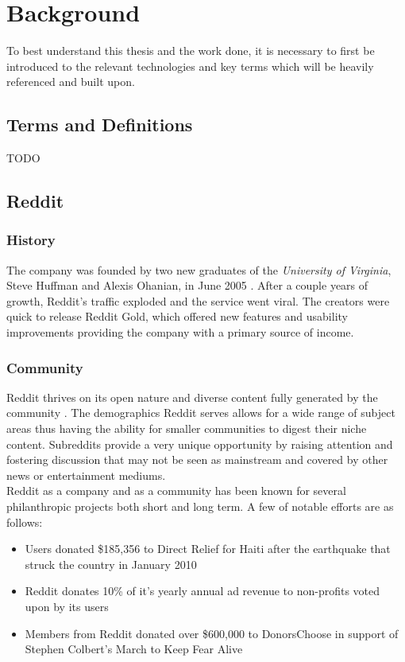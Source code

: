 \documentclass[msc,oneside]{ubcthesis}%
\begin{document}
\chapter{Background}
To best understand this thesis and the work done, it is necessary to first be introduced to the relevant technologies and key terms which will be heavily referenced and built upon.

\section{Terms and Definitions}
TODO

\section{Reddit}

\subsection{History}
The company was founded by two new graduates of the \textit{University of Virginia}, Steve Huffman and Alexis Ohanian, in June 2005 \citep{Guardian}. After a couple years of growth, Reddit's traffic exploded and the service went viral. The creators were quick to release Reddit Gold, which offered new features and usability improvements providing the company with a primary source of income.

\subsection{Community}
Reddit thrives on its open nature and diverse content fully generated by the community \citep{Atlantic}. The demographics Reddit serves allows for a wide range of subject areas thus having the ability for smaller communities to digest their niche content. Subreddits provide a very unique opportunity by raising attention and fostering discussion that may not be seen as mainstream and covered by other news or entertainment mediums.\\
Reddit as a company and as a community has been known for several philanthropic projects both short and long term. A few of notable efforts are as follows:
\begin{itemize}
\item{Users donated \$185,356 to Direct Relief for Haiti after the earthquake that struck the country in January 2010}
\item{Reddit donates 10\% of it's yearly annual ad revenue to non-profits voted upon by its users \citep{RedditBlog}}
\item{Members from Reddit donated over \$600,000 to DonorsChoose in support of Stephen Colbert's March to Keep Fear Alive \citep{DonorsChoose}}
\end{itemize}
\end{document}
